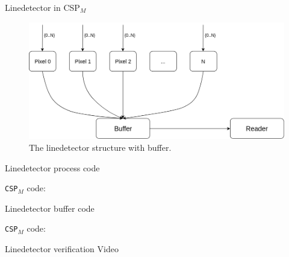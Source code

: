 \documentclass[11pt]{beamer}
\newcommand{\cspm}{CSP$_M$}
\begin{document}
\begin{frame}{Linedetector in \cspm{}}
     \begin{figure}[!ht]
          \centering
          \includegraphics[scale=0.25]{figures/Linedetector_buffer.png}
          \caption{The linedetector structure with buffer.}
     \end{figure}
\end{frame}


\begin{frame}{Linedetector process code}
      \begin{block}{}
       \texttt{\cspm{}} code:
         \vspace{5mm}

          \scalebox{0.8}{\usebox{\cspmlinedetectprocesses}}
      \end{block}
\end{frame}

\begin{frame}{Linedetector buffer code}
      \begin{block}{}
       \texttt{\cspm{}} code:
         \vspace{5mm}

          \scalebox{0.8}{\usebox{\cspmlinedetectbuffer}}
      \end{block}
\end{frame}

\begin{frame}{Linedetector verification}
     Video
\end{frame}
\end{document}
